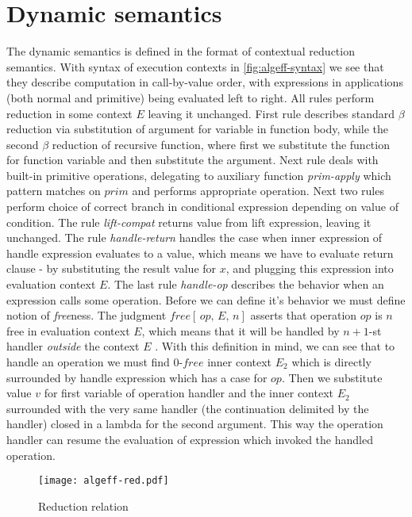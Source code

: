 \documentclass[inz, english, shortabstract]{iithesis}
\begin{document}
\section{Dynamic semantics}
The dynamic semantics is defined in the format of contextual reduction semantics.
With syntax of execution contexts in \autoref{fig:algeff-syntax} we see that they describe computation in call-by-value order, with expressions in applications (both normal and primitive) being evaluated left to right.
All rules perform reduction in some context $ E $ leaving it unchanged.
First rule describes standard $ \beta $ reduction via substitution of argument for variable in function body, while the second $ \beta $ reduction of recursive function, where first we substitute the function for function variable and then substitute the argument.
Next rule deals with built-in primitive operations, delegating to auxiliary function \textit{prim-apply} which pattern matches on $ prim $ and performs appropriate operation.
Next two rules perform choice of correct branch in conditional expression depending on value of condition.
The rule \textit{lift-compat} returns value from lift expression, leaving it unchanged.
The rule \textit{handle-return} handles the case when inner expression of handle expression evaluates to a value, which means we have to evaluate return clause - by substituting the result value for $ x $, and plugging this expression into evaluation context $ E $.
The last rule \textit{handle-op} describes the behavior when an expression calls some operation.
Before we can define it's behavior we must define notion of \textit{free}ness.
The judgment $ free[ \, op , \, E , \, n] $ asserts that operation $ op $ is $ n $ free in evaluation context $ E $, which means that it will be handled by $ n + 1 $-st handler \emph{outside} the context $ E $ \cite{Biernacki2017}.
With this definition in mind, we can see that to handle an operation we must find $0$-$free$ inner context $ E_2 $ which is directly surrounded by handle expression which has a case for $ op $.
Then we substitute value $ v $ for first variable of operation handler and the inner context $ E_2 $ surrounded with the very same handler (the continuation delimited by the handler) closed in a lambda for the second argument.
This way the operation handler can resume the evaluation of expression which invoked the handled operation.

\begin{figure}
  \centering
  \texttt{[image: algeff-red.pdf]}
  \caption{Reduction relation} 
  \label{fig:algeff-red}
\end{figure} 
\end{document}
